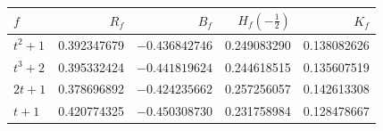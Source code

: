 \begin{tabular}{@{}lrrrr@{}}
\toprule
$f$ & $R_f$ & $B_f$ & $H_f(-\tfrac12)$ & $K_f$ \\
\midrule
$t^2+1$ & 0.392347679 & $-0.436842746$ & 0.249083290 & 0.138082626 \\
$t^3+2$ & 0.395332424 & $-0.441819624$ & 0.244618515 & 0.135607519 \\
$2t+1$ & 0.378696892 & $-0.424235662$ & 0.257256057 & 0.142613308 \\
$t+1$ & 0.420774325 & $-0.450308730$ & 0.231758984 & 0.128478667 \\
\bottomrule
\end{tabular}

